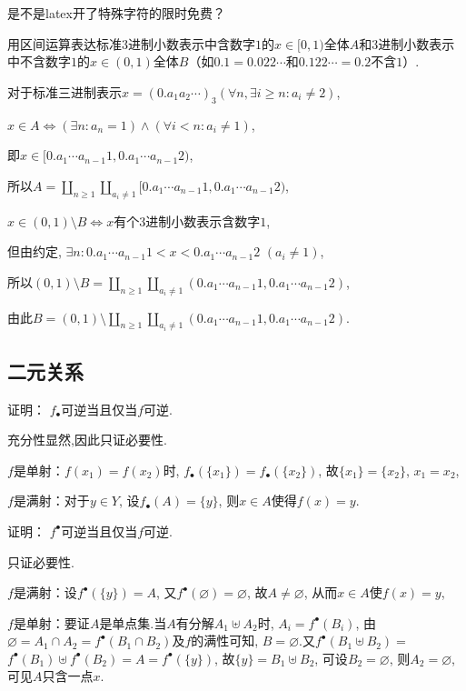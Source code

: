 \begin{solution}
是不是latex开了特殊字符的限时免费？
\end{solution}
\begin{4}
用区间运算表达标准$3$进制小数表示中含数字$1$的$x \in [0, 1) $全体$A$和$3$进制小数表示中不含数字$1$的$x \in (0, 1) $全体$B$（如$0.1=0.022\cdots$和$0.122\cdots=0.2$不含$1$）.
\end{4}
\begin{solution}
对于标准三进制表示$x = (0.a_1a_2\cdots)_3 (\forall n,  \exists i \geqslant n : a_i \neq 2)$,

$x \in A \iff (\exists n:a_n=1)\land (\forall i<n:a_i\neq1)$,

即$x \in [0.a_1 \cdots a_{n-1}1, 0.a_1 \cdots a_{n-1}2)$,

所以$A=\coprod\limits_{n \geqslant 1}\coprod\limits_{a_i \neq 1}[0.a_1 \cdots a_{n-1}1, 0.a_1 \cdots a_{n-1}2)$,


$x\in (0, 1)\setminus B \iff x$有个$3$进制小数表示含数字$1$,

但由约定, $\exists n:0.a_1 \cdots a_{n-1}1<x<0.a_1 \cdots a_{n-1}2$ $(a_i\neq 1)$,

所以$(0, 1)\setminus B=\coprod\limits_{n \geqslant 1}\coprod\limits_{a_i \neq 1}(0.a_1 \cdots a_{n-1}1, 0.a_1 \cdots a_{n-1}2)$,

由此$B=(0, 1)\setminus\coprod\limits_{n \geqslant 1}\coprod\limits_{a_i \neq 1}(0.a_1 \cdots a_{n-1}1, 0.a_1 \cdots a_{n-1}2)$.
\end{solution}


\subsection{二元关系}
\begin{2}
证明： $f_{\bullet}$可逆当且仅当$f$可逆.

\end{2}

\begin{solution}
充分性显然,因此只证必要性.

$f$是单射：$f(x_1)=f(x_2)$时, $f_{\bullet}(\{x_1\})=f_{\bullet}(\{x_2\})$, 故$\{x_1\}=\{x_2\}$, $x_1=x_2$,

$f$是满射：对于$y\in Y$, 设$f_{\bullet}(A)=\{y\}$, 则$x\in A$使得$f(x)=y$.
\end{solution}

\begin{3}
证明： $f^{\bullet}$可逆当且仅当$f$可逆.
\end{3}
\begin{solution}
只证必要性.

$f$是满射：设$f^{\bullet}(\{y\})=A$, 又$f^{\bullet}(\varnothing)=\varnothing$, 故$A\neq \varnothing$, 从而$x\in A$使$f(x)=y$,

$f$是单射：要证$A$是单点集.当$A$有分解$A_1\uplus A_2$时, $A_i=f^{\bullet}(B_i)$, 
由$\varnothing=A_1 \cap A_2=f^{\bullet}(B_1 \cap B_2)$及$f$的满性可知, 
$B=\varnothing$.又$f^{\bullet}(B_1 \uplus B_2)=$$f^{\bullet}(B_1 )\uplus f^{\bullet}(B_2)=A=f^{\bullet}(\{y\})$, 
故$\{y\}=B_1 \uplus B_2$, 可设$B_2=\varnothing$, 则$A_2=\varnothing$, 可见$A$只含一点$x$.
\end{solution}


